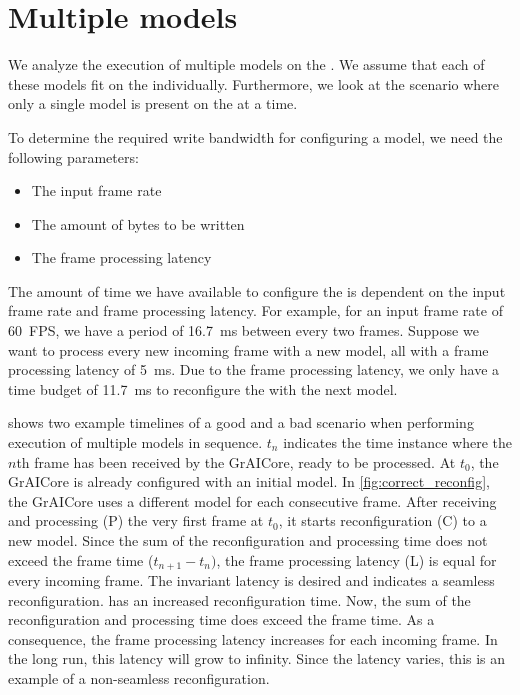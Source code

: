 \section{Multiple models}
We analyze the execution of multiple models on the \graicore{}.
We assume that each of these models fit on the \graicore{} individually.
Furthermore, we look at the scenario where only a single model is present on the \graicore{} at a time.

To determine the required write bandwidth for configuring a model, we need the following parameters:
\begin{itemize}
    \item The input frame rate
    \item The amount of bytes to be written
    \item The frame processing latency
\end{itemize}

The amount of time we have available to configure the \graicore{} is dependent on the input frame rate and frame processing latency.
For example, for an input frame rate of \SI{60}{FPS}, we have a period of \SI{16.7}{ms} between every two frames.
Suppose we want to process every new incoming frame with a new model, all with a frame processing latency of \SI{5}{ms}. 
Due to the frame processing latency, we only have a time budget of \SI{11.7}{ms} to reconfigure the \graicore{} with the next model.

 shows two example timelines of a good and a bad scenario when performing execution of multiple models in sequence.
$t_n$ indicates the time instance where the $n$th frame has been received by the GrAICore, ready to be processed.
At $t_0$, the GrAICore is already configured with an initial model.
In \cref{fig:correct_reconfig}, the GrAICore uses a different model for each consecutive frame.
After receiving and processing (P) the very first frame at $t_0$, it starts reconfiguration (C) to a new model.
Since the sum of the reconfiguration and processing time does not exceed the frame time ($t_{n+1} - t_{n})$, the frame processing latency (L) is equal for every incoming frame.
The invariant latency is desired and indicates a seamless reconfiguration.
 has an increased reconfiguration time.
Now, the sum of the reconfiguration and processing time does exceed the frame time.
As a consequence, the frame processing latency increases for each incoming frame.
In the long run, this latency will grow to infinity.
Since the latency varies, this is an example of a non-seamless reconfiguration.

